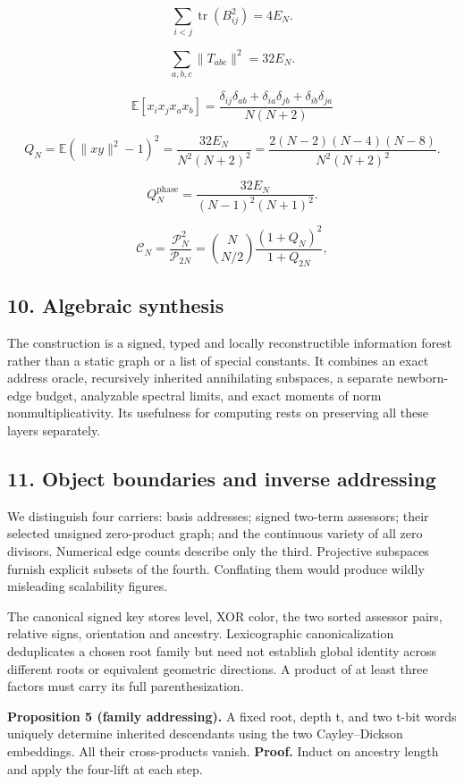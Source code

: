 \documentclass[
  10pt,
]{article}
\begin{document}
\[
\sum_{i<j}\operatorname{tr}(B_{ij}^2)=4E_N.
\tag{19}
\]

\[
\sum_{a,b,c}\|T_{abc}\|^2=32E_N.
\tag{20}
\]

\[
\mathbb E[x_ix_jx_ax_b]=\frac{\delta_{ij}\delta_{ab}+\delta_{ia}\delta_{jb}+\delta_{ib}\delta_{ja}}{N(N+2)}
\]

\[
Q_N=\mathbb E(\|xy\|^2-1)^2
=\frac{32E_N}{N^2(N+2)^2}
=\frac{2(N-2)(N-4)(N-8)}{N^2(N+2)^2}.
\tag{21}
\]

\[
Q_N^{\mathrm{phase}}=\frac{32E_N}{(N-1)^2(N+1)^2}.
\tag{22}
\]

\[
\mathcal C_N=\frac{\mathcal P_N^2}{\mathcal P_{2N}}=\binom N{N/2}\frac{(1+Q_N)^2}{1+Q_{2N}},
\tag{23}
\]

\subsection{10. Algebraic synthesis}\label{algebraic-synthesis}

The construction is a signed, typed and locally reconstructible
information forest rather than a static graph or a list of special
constants. It combines an exact address oracle, recursively inherited
annihilating subspaces, a separate newborn-edge budget, analyzable
spectral limits, and exact moments of norm nonmultiplicativity. Its
usefulness for computing rests on preserving all these layers
separately.

\subsection{11. Object boundaries and inverse
addressing}\label{object-boundaries-and-inverse-addressing}

We distinguish four carriers: basis addresses; signed two-term
assessors; their selected unsigned zero-product graph; and the
continuous variety of all zero divisors. Numerical edge counts describe
only the third. Projective subspaces furnish explicit subsets of the
fourth. Conflating them would produce wildly misleading scalability
figures.

The canonical signed key stores level, XOR color, the two sorted
assessor pairs, relative signs, orientation and ancestry. Lexicographic
canonicalization deduplicates a chosen root family but need not
establish global identity across different roots or equivalent geometric
directions. A product of at least three factors must carry its full
parenthesization.

\textbf{Proposition 5 (family addressing).} A fixed root, depth t, and
two t-bit words uniquely determine inherited descendants using the two
Cayley--Dickson embeddings. All their cross-products vanish.
\textbf{Proof.} Induct on ancestry length and apply the four-lift at
each step.
\end{document}
